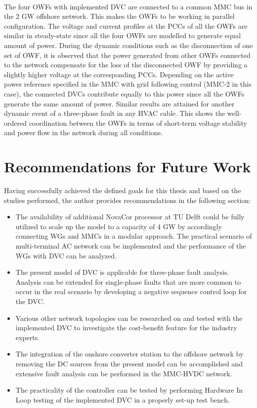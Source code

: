 \paragraph{} The four \gls{OWF}s with implemented \gls{DVC} are connected to a common \gls{MMC} bus in the 2 GW offshore network. This makes the \gls{OWF}s to be working in parallel configuration. The voltage and current profiles at the \gls{PCC}s of all the \gls{OWF}s are similar in steady-state since all the four \gls{OWF}s are modelled to generate equal amount of power. During the dynamic conditions such as the disconnection of one set of \gls{OWF}, it is observed that the power generated from other \gls{OWF}s connected to the network compensate for the loss of the disconnected \gls{OWF} by providing a slightly higher voltage at the corresponding \gls{PCC}s. Depending on the active power reference specified in the \gls{MMC} with grid following control (\gls{MMC}-2 in this case), the connected \gls{DVC}s contribute equally to this power since all the \gls{OWF}s generate the same amount of power. Similar results are attained for another dynamic event of a three-phase fault in any \gls{HVAC} cable. This shows the well-ordered coordination between the \gls{OWF}s in terms of short-term voltage stability and power flow in the network during all conditions.  

\section{Recommendations for Future Work}
Having successfully achieved the defined goals for this thesis and based on the studies performed, the author provides recommendations in the following section:  
\begin{itemize}
    \item The availability of additional NovaCor processor at TU Delft could be fully utilized to scale up the model to a capacity of 4 GW by accordingly connecting \gls{WG}s and \gls{MMC}s in a modular approach. The practical scenario of multi-terminal \gls{AC} network can be implemented and the performance of the \gls{WG}s with \gls{DVC} can be analyzed.
    \item The present model of \gls{DVC} is applicable for three-phase fault analysis. Analysis can be extended for single-phase faults that are more common to occur in the real scenario by developing a negative sequence control loop for the \gls{DVC}.
    \item Various other network topologies can be researched on and tested with the implemented \gls{DVC} to investigate the cost-benefit feature for the industry experts. 
    \item The integration of the onshore converter station to the offshore network by removing the \gls{DC} sources from the present model can be accomplished and extensive fault analysis can be performed in the \gls{MMC}-\gls{HVDC} network.
    \item The practicality of the controller can be tested by performing Hardware In Loop testing of the implemented \gls{DVC} in a properly set-up test bench.
\end{itemize}